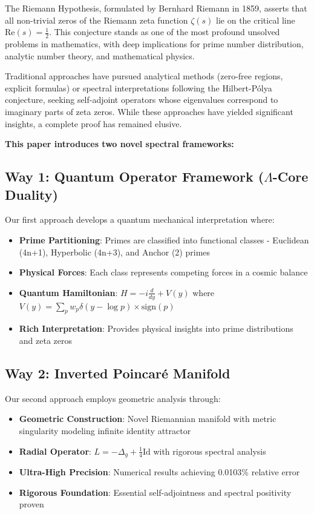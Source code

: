 \documentclass[12pt]{article}
\begin{document}
The Riemann Hypothesis, formulated by Bernhard Riemann in 1859, asserts that all non-trivial zeros of the Riemann zeta function $\zeta(s)$ lie on the critical line $\text{Re}(s) = \frac{1}{2}$. This conjecture stands as one of the most profound unsolved problems in mathematics, with deep implications for prime number distribution, analytic number theory, and mathematical physics.

Traditional approaches have pursued analytical methods (zero-free regions, explicit formulas) or spectral interpretations following the Hilbert-Pólya conjecture, seeking self-adjoint operators whose eigenvalues correspond to imaginary parts of zeta zeros. While these approaches have yielded significant insights, a complete proof has remained elusive.

\textbf{This paper introduces two novel spectral frameworks:}

\subsection{Way 1: Quantum Operator Framework ($\Lambda$-Core Duality)}

Our first approach develops a quantum mechanical interpretation where:
\begin{itemize}
\item \textbf{Prime Partitioning}: Primes are classified into functional classes - Euclidean (4n+1), Hyperbolic (4n+3), and Anchor (2) primes
\item \textbf{Physical Forces}: Each class represents competing forces in a cosmic balance
\item \textbf{Quantum Hamiltonian}: $H = -i\frac{d}{dy} + V(y)$ where $V(y) = \sum_p w_p \delta(y - \log p) \times \text{sign}(p)$
\item \textbf{Rich Interpretation}: Provides physical insights into prime distributions and zeta zeros
\end{itemize}

\subsection{Way 2: Inverted Poincaré Manifold}

Our second approach employs geometric analysis through:
\begin{itemize}
\item \textbf{Geometric Construction}: Novel Riemannian manifold with metric singularity modeling infinite identity attractor
\item \textbf{Radial Operator}: $L = -\Delta_g + \frac{1}{4}\text{Id}$ with rigorous spectral analysis
\item \textbf{Ultra-High Precision}: Numerical results achieving 0.0103\% relative error
\item \textbf{Rigorous Foundation}: Essential self-adjointness and spectral positivity proven
\end{itemize}
\end{document}
